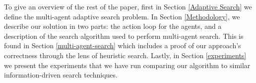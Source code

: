 \documentclass[letterpaper, 10 pt, conference]{IEEEConference}
\begin{document}

To give an overview of the rest of the paper, first in Section \ref{Adaptive Search} we define the multi-agent adaptive search problem.  In Section \ref{Methodology}, we describe our solution in two parts: the action loop for the agents, and a description of the search algorithm used to perform multi-agent search. This is found in Section \ref{multi-agent-search} which includes a proof of our approach's correctness through the lens of heuristic search. Lastly, 
 in Section \ref{experiments} we present the experiments that we have run comparing our algorithm to similar information-driven search techniques.   



\end{document}
